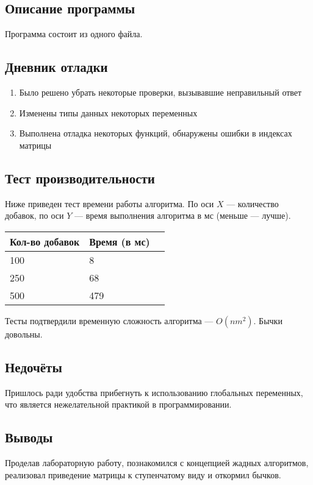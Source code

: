 \documentclass[12pt]{article}
\begin{document}
    \subsection*{Описание программы}

    Программа состоит из одного файла.

    \subsection*{Дневник отладки}

    \begin{enumerate}
    \item Было решено убрать некоторые проверки, вызывавшие неправильный ответ
    \item Изменены типы данных некоторых переменных
    \item Выполнена отладка некоторых функций, обнаружены ошибки в индексах
    матрицы
    \end{enumerate}


    \subsection*{Тест производительности}

    Ниже приведен тест времени работы алгоритма. По оси $X$ — количество 
    добавок, по оси $Y$ — время выполнения алгоритма в мс (меньше — лучше).
    

    \begin{tabular}{ | l | l | l | }
        \hline
            Кол-во добавок & Время (в мс) \\ \hline
            100              & 8           \\
            250              & 68          \\
            500              & 479         \\
        \hline
    \end{tabular}

    Тесты подтвердили временную сложность алгоритма — $O(nm^2)$. Бычки довольны.

    \subsection*{Недочёты}

    Пришлось ради удобства прибегнуть к использованию глобальных переменных, 
    что является нежелательной практикой в программировании.

    \subsection*{Выводы}

    Проделав лабораторную работу, познакомился с концепцией жадных алгоритмов, 
    реализовал приведение матрицы к ступенчатому виду и откормил бычков.
\end{document}
